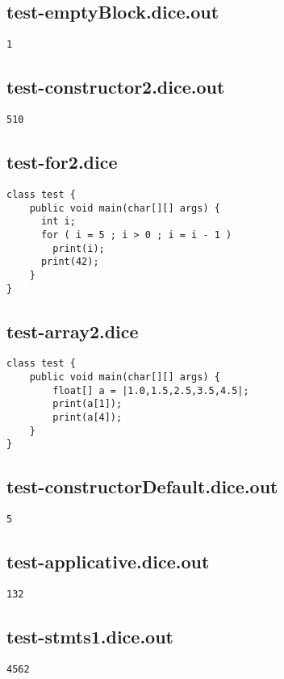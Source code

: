 \subsection{test-emptyBlock.dice.out}
\begin{verbatim}
1
\end{verbatim}
\pagebreak
\subsection{test-constructor2.dice.out}
\begin{verbatim}
510
\end{verbatim}
\pagebreak
\subsection{test-for2.dice}
\begin{verbatim}
class test {
	public void main(char[][] args) {
	  int i;
	  for ( i = 5 ; i > 0 ; i = i - 1 )
	    print(i); 
	  print(42);
	}
}

\end{verbatim}
\pagebreak
\subsection{test-array2.dice}
\begin{verbatim}
class test {
	public void main(char[][] args) {
		float[] a = |1.0,1.5,2.5,3.5,4.5|;
		print(a[1]);
		print(a[4]);
	}
}

\end{verbatim}
\pagebreak
\subsection{test-constructorDefault.dice.out}
\begin{verbatim}
5
\end{verbatim}
\pagebreak
\subsection{test-applicative.dice.out}
\begin{verbatim}
132
\end{verbatim}
\pagebreak
\subsection{test-stmts1.dice.out}
\begin{verbatim}
4562
\end{verbatim}
\pagebreak
